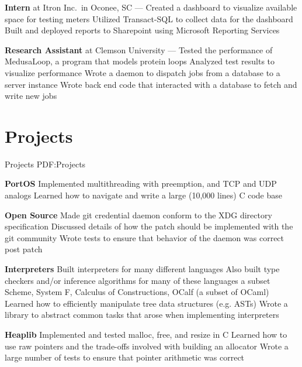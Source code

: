 \documentclass[letterpaper,10pt,oneside]{simpleresume}
\begin{document}
\begin{minipage}[t][0pt]{\linewidth}
\begin{body}
\textbf{Intern} at Itron Inc.\ in Oconee, SC
\hfill
{} --- 
\BulletItem%
Created a dashboard to visualize available space for testing meters
\BulletItem%
Utilized Transact-SQL to collect data for the dashboard
\BulletItem%
Built and deployed reports to Sharepoint using Microsoft Reporting Services

\textbf{Research Assistant} at Clemson University
\hfill
{} --- 
\BulletItem%
Tested the performance of MedusaLoop, a program that models protein loops
\BulletItem%
Analyzed test results to visualize performance
\BulletItem%
Wrote a daemon to dispatch jobs from a database to a server instance
\BulletItem%
Wrote back end code that interacted with a database to fetch and write new jobs

\section%
{Projects}
{Projects}
{PDF:Projects}

\textbf{PortOS}
\BulletItem%
Implemented multithreading with preemption, and TCP and UDP analogs
\BulletItem%
Learned how to navigate and write a large (10,000 lines) C code base
\GapNoBreak%

\textbf{Open Source}
\BulletItem%
Made git credential daemon conform to the XDG directory specification
\BulletItem%
Discussed details of how the patch should be implemented with the git community
\BulletItem%
Wrote tests to ensure that behavior of the daemon was correct post patch
\GapNoBreak%

\textbf{Interpreters}
\BulletItem%
Built interpreters for many different languages
\BulletItem%
Also built type checkers and/or inference algorithms for many of these languages
\BulletItem%
a subset Scheme, System F, Calculus of Constructions, OCalf (a subset of OCaml)
\BulletItem%
Learned how to efficiently manipulate tree data structures (e.g. ASTs)
\BulletItem%
Wrote a library to abstract common tasks that arose when implementing
interpreters
\GapNoBreak%

\textbf{Heaplib}
\BulletItem%
Implemented and tested malloc, free, and resize in C
\BulletItem%
Learned how to use raw pointers and the trade-offs involved with building
an allocator
\BulletItem%
Wrote a large number of tests to ensure that pointer arithmetic was correct
\GapNoBreak%



\end{body}
\end{minipage}
\end{document}
